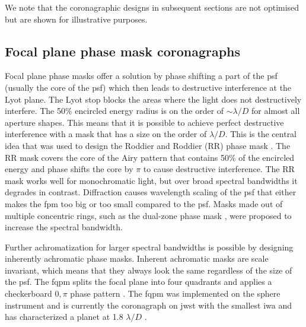 \documentclass[letterpaper]{ar-1col}
\newcommand{\ld}{$\lambda/D$}
\newcommand{\acc}[1]{\entry{\acs{#1}}{\acl{#1}}}
\begin{document}
We note that the coronagraphic designs in subsequent sections are not optimised but are shown for illustrative purposes.

\subsection{Focal plane phase mask coronagraphs}

Focal plane phase masks offer a solution by phase shifting a part of the \ac{psf} (usually the core of the \ac{psf}) which then leads to destructive interference at the Lyot plane.
%
The Lyot stop blocks the areas where the light does not destructively interfere.
%
The 50\% encircled energy radius is on the order of $\sim$\ld{} for almost all aperture shapes.
%
This means that it is possible to achieve perfect destructive interference with a mask that has a size on the order of \ld{}.
%
This is the central idea that was used to design the Roddier and Roddier (RR) phase mask \citep{roddier1997stellar}.
%
The RR mask covers the core of the Airy pattern that contains 50\% of the encircled energy and phase shifts the core by $\pi$ to cause destructive interference.
%
The RR mask works well for monochromatic light, but over broad spectral bandwidths it degrades in contrast.
%
Diffraction causes wavelength scaling of the \ac{psf} that either makes the \ac{fpm} too big or too small compared to the \ac{psf}.
%
Masks made out of multiple concentric rings, such as the dual-zone phase mask \citep{soummer2003achromatic}, were proposed to increase the spectral bandwidth.

\begin{armarginnote}[]
\acc{ovc}
\acc{fqpm}
\acc{agpm}
\end{armarginnote}

Further achromatization for larger spectral bandwidths is possible by designing inherently achromatic phase masks.
%
Inherent achromatic masks are scale invariant, which means that they always look the same regardless of the size of the \ac{psf}.
%
The \ac{fqpm} splits the focal plane into four quadrants and applies a checkerboard $0,\pi$ phase pattern \citep{Riaud00}.
%
The \ac{fqpm} was implemented on the \ac{sphere} instrument \citep{Boccaletti04} and is currently the coronagraph on \ac{jwst} with the smallest \ac{iwa} and has characterized a planet at 1.8 \ld{} \citep{franson2024jwst}. 
\end{document}
